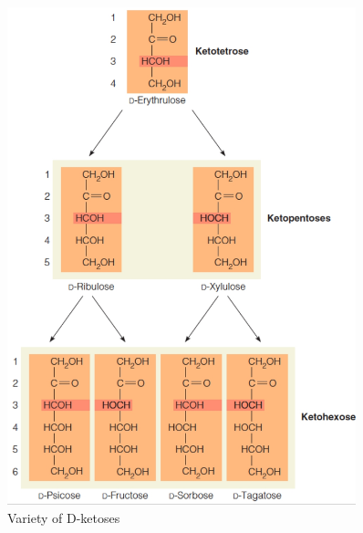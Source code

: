 \documentclass[]{article}
\begin{document}
\begin{figure}[H]
	\caption{Variety of D-ketoses}\label{fig:ketoses} 
	\includegraphics[width=0.9\textwidth]{ketoses}
\end{figure}
\end{document}
